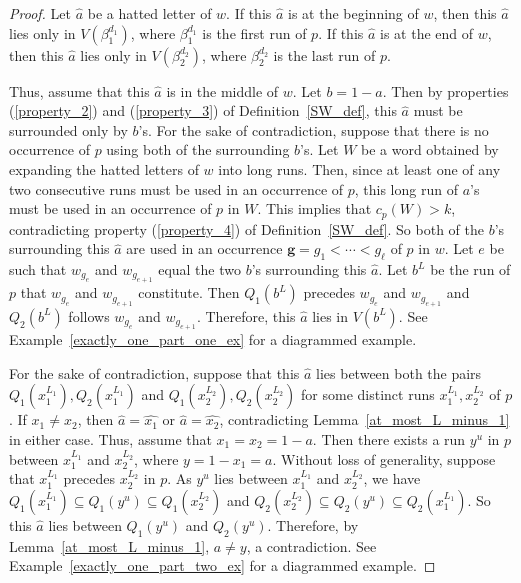 \documentclass[11pt]{amsart}
\newcommand{\hatted}[1]{\widehat{#1}}
\begin{document}
\begin{proof}
    Let $\hatted{a}$ be a hatted letter of $w$. If this $\hatted{a}$ is at the beginning of $w$, then this $\hatted{a}$ lies only in $V(\beta_1^{d_1})$, where $\beta_1^{d_1}$ is the first run of $p$. If this $\hatted{a}$ is at the end of $w$, then this $\hatted{a}$ lies only in $V(\beta_2^{d_2})$, where $\beta_2^{d_2}$ is the last run of $p$.
    
    Thus, assume that this $\hatted{a}$ is in the middle of $w$. Let $b=1-a$. Then by properties (\ref{property_2}) and (\ref{property_3}) of Definition~\ref{SW_def}, this $\hatted{a}$ must be surrounded only by $b$'s. For the sake of contradiction, suppose that there is no occurrence of $p$ using both of the surrounding $b$'s. Let $W$ be a word obtained by expanding the hatted letters of $w$ into long runs. Then, since at least one of any two consecutive runs must be used in an occurrence of $p$, this long run of $a$'s must be used in an occurrence of $p$ in $W$. This implies that $c_p(W)>k$, contradicting property (\ref{property_4}) of Definition~\ref{SW_def}. So both of the $b$'s surrounding this $\hatted{a}$ are used in an occurrence $\mathbf{g}=g_1<\cdots< g_{\ell}$ of $p$ in $w$. Let $e$ be such that $w_{g_e}$ and $w_{g_{e+1}}$ equal the two $b$'s surrounding this $\hatted{a}$. Let $b^L$ be the run of $p$ that $w_{g_e}$ and $w_{g_{e+1}}$ constitute. Then $Q_1(b^L)$ precedes $w_{g_e}$ and $w_{g_{e+1}}$ and $Q_2(b^L)$ follows $w_{g_e}$ and $w_{g_{e+1}}$. Therefore, this $\hatted{a}$ lies in $V(b^L)$. See Example~\ref{exactly_one_part_one_ex} for a diagrammed example.
    
    For the sake of contradiction, suppose that this $\hatted{a}$ lies between both the pairs $Q_1(x_1^{L_1}),Q_2(x_1^{L_1})$ and $Q_1(x_2^{L_2}),Q_2(x_2^{L_2})$ for some distinct runs $x_1^{L_1},x_2^{L_2}$ of $p$. If $x_1\neq x_2$, then $\hatted{a}=\hatted{x_1}$ or $\hatted{a}=\hatted{x_2}$, contradicting Lemma~\ref{at_most_L_minus_1} in either case. Thus, assume that $x_1=x_2=1-a$. Then there exists a run $y^{u}$ in $p$ between $x_1^{L_1}$ and $x_2^{L_2}$, where $y=1-x_1=a$. Without loss of generality, suppose that $x_1^{L_1}$ precedes $x_2^{L_2}$ in $p$. As $y^u$ lies between $x_1^{L_1}$ and $x_2^{L_2}$, we have $Q_1(x_1^{L_1})\subseteq Q_1(y^u)\subseteq Q_1(x_2^{L_2})$ and $Q_2(x_2^{L_2})\subseteq Q_2(y^u)\subseteq Q_2(x_1^{L_1})$. So this $\hatted{a}$ lies between $Q_1(y^u)$ and $Q_2(y^u)$. Therefore, by Lemma~\ref{at_most_L_minus_1}, $a\neq y$, a contradiction. See Example~\ref{exactly_one_part_two_ex} for a diagrammed example.
\end{proof}
\end{document}
